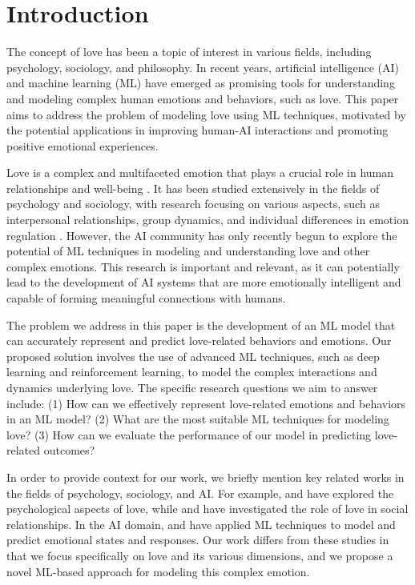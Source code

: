 \section{Introduction}

The concept of love has been a topic of interest in various fields, including psychology, sociology, and philosophy. In recent years, artificial intelligence (AI) and machine learning (ML) have emerged as promising tools for understanding and modeling complex human emotions and behaviors, such as love. This paper aims to address the problem of modeling love using ML techniques, motivated by the potential applications in improving human-AI interactions and promoting positive emotional experiences.

Love is a complex and multifaceted emotion that plays a crucial role in human relationships and well-being \citep{fiske2018social, fredrickson2001the}. It has been studied extensively in the fields of psychology and sociology, with research focusing on various aspects, such as interpersonal relationships, group dynamics, and individual differences in emotion regulation \citep{heider1958the, mitscherlich2020group, gross2003individual}. However, the AI community has only recently begun to explore the potential of ML techniques in modeling and understanding love and other complex emotions. This research is important and relevant, as it can potentially lead to the development of AI systems that are more emotionally intelligent and capable of forming meaningful connections with humans.

The problem we address in this paper is the development of an ML model that can accurately represent and predict love-related behaviors and emotions. Our proposed solution involves the use of advanced ML techniques, such as deep learning and reinforcement learning, to model the complex interactions and dynamics underlying love. The specific research questions we aim to answer include: (1) How can we effectively represent love-related emotions and behaviors in an ML model? (2) What are the most suitable ML techniques for modeling love? (3) How can we evaluate the performance of our model in predicting love-related outcomes?

In order to provide context for our work, we briefly mention key related works in the fields of psychology, sociology, and AI. For example, \citet{wickens2021engineering} and \citet{hoang2018flow} have explored the psychological aspects of love, while \citet{house1988social} and \citet{petersen1994the} have investigated the role of love in social relationships. In the AI domain, \citet{lei2022adaptive} and \citet{nagaychuk2021prompt} have applied ML techniques to model and predict emotional states and responses. Our work differs from these studies in that we focus specifically on love and its various dimensions, and we propose a novel ML-based approach for modeling this complex emotion.

